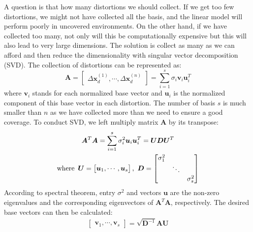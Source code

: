 A question is that how many distortions we should collect.
If we get too few distortions, we might not have collected all the basis, and the linear model will perform poorly in uncovered environments.
On the other hand, if we have collected too many, not only will this be computationally expensive but this will also lead to very large dimensions. 
The solution is collect as many as we can afford and then reduce the dimensionality with singular vector decomposition (SVD). The collection of distortions can be represented as:
\begin{equation}
\bm{A} = 
\begin{bmatrix}
\Delta \bm{x}_d^{(1)}, \cdots, \Delta \bm{x}_d^{(n)}
\end{bmatrix}
= \sum_{i=1}^s \sigma_i \bm{v}_i \bm{u}_i^T
\label{SVD}
\end{equation}
where $\bm{v}_i$ stands for each normalized base vector and $\bm{u}_i$ is the normalized component of this base vector in each distortion.
The number of basis $s$ is much smaller than $n$ as we have collected more than we need to ensure a good coverage.
To conduct SVD, we left multiply matrix $\bm{A}$ by its transpose:
\begin{equation}
\begin{gathered}
\bm{A}^T \bm{A} = 
\sum_{i=1}^s \sigma_i^2 \bm{u}_i \bm{u}_i^T = \bm{U} \bm{D} \bm{U}^T
\\
\text{where \,}
\bm{U} = 
\begin{bmatrix}
\bm{u}_1, \cdots, \bm{u}_s
\end{bmatrix}
\text{, \,}
\bm{D} = 
\begin{bmatrix}
\sigma_1^2 &  &  \\
 & \ddots &  \\
 &  & \sigma_s^2 \\
\end{bmatrix}
\end{gathered}
\label{ATA}
\end{equation}
According to spectral theorem, entry $\sigma^2$ and vectors $\bm{u}$  are the non-zero eigenvalues and the corresponding eigenvectors of $\bm{A}^T\bm{A}$, respectively. 
The desired base vectors can then be calculated:
\begin{equation}
\begin{gathered}
\begin{bmatrix}
\bm{v}_1, \cdots, \bm{v}_s
\end{bmatrix} = 
\sqrt{\bm{D}^{-1}} \bm{A} \bm{U}
\end{gathered}
\label{basis}
\end{equation}
